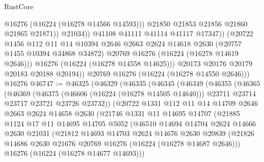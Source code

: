 \begin{lexlean}{RustCore}
\begin{coremodule}
                          @16276
                          (@16224 (@16278 @14566 @14593)))
                        @21850
                        @21853
                        @21856
                        @21860
                        @21865
                        @21871))
                    @21034))
                @41108
                @41111
                @41114
                @41117
                @17347))
            (@20722
              @1456
              @112
              @11
              @14
              @10394
              @2646
              @2663
              @2624
              @14618
              @2630
              (@20757 @1455 @10394 @34868 @34872)
              @20769
              @16276
              (@16224 (@16278 @14619 @2646)))
            @16276
            (@16224 (@16278 @14558 @14625)))
          @20173
          @20176
          @20179
          @20183
          @20188
          @20194))
      @20769
      @16276
      (@16224 (@16278 @14550 @2646)))
    @16276
@46747 := @46325
    (@46329
      (@46335
        (@46345
          (@46349
            (@46355
              (@46365
                (@46369
                  (@46375
                    (@46606 (@16224 (@16278 @14505 @14640)))
                    @23711
                    @23714
                    @23717
                    @23721
                    @23726
                    @23732))
                (@20722
                  @1331
                  @112
                  @11
                  @14
                  @14709
                  @2646
                  @2663
                  @2624
                  @14658
                  @2630
                  (@21746
                    @1331
                    @11
                    @14695
                    @14707
                    (@21885
                      @1124
                      @17
                      @11
                      @14695
                      @14705
                      @5052
                      (@46510
                        @14694
                        @14704
                        @2624
                        @14666
                        @2630
                        @21031
                        (@21812
                          @14693
                          @14703
                          @2624
                          @14676
                          @2630
                          @20839
                          (@21826 @14686 @2630 @21676 @20769 @16276 (@16224 (@16278 @14687 @2646)))
                          @16276
                          (@16224 (@16278 @14677 @14693)))

\end{coremodule}
\end{lexlean}
